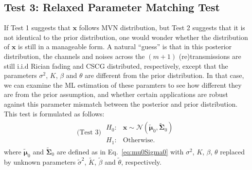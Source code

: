 \documentclass[journal,draftcls,onecolumn,12pt,twoside]{IEEEtran}
\begin{document}
\subsection{Test 3: Relaxed Parameter Matching Test}
If Test 1 suggests that $\mathbf{x}$ follows MVN
distribution, but Test 2 suggests that it is not identical to
the prior distribution, one would wonder whether the distribution of
$\mathbf{x}$ is still in a manageable form. A natural ``guess'' is that in this
posterior distribution, the channels and noises across the $(m+1)$
(re)transmissions are still i.i.d Rician fading and CSCG distributed,
respectively, except that the parameters $\sigma^2$, $K$, $\beta$ and $\theta$
are different from the prior distribution. In that case, we can examine the
ML estimation of these paramters to see how different they are
from the prior assumption, and whether certain applications are robust against
this parameter mismatch between the posterior and prior distribution. This test
is formulated as follows:
\begin{align}
  \mbox{(Test 3) } \begin{array}{ll}H_0: & \mathbf{x}\sim
  \mathcal{N}(\tilde{\bm{\mu}}_0, \tilde{\mathbf{\Sigma}}_0)
  \\
  H_1:
  &
  \mbox{Otherwise.}
  \end{array}
\end{align}
where $\tilde{\bm{\mu}}_0$ and $\tilde{\mathbf{\Sigma}}_0$ are defined as in
Eq.~\eqref{eq:mu0Sigma0} with $\sigma^2$, $K$, $\beta$, $\theta$ replaced by
unknown parameters $\tilde{\sigma}^2$, $\tilde{K}$, $\tilde{\beta}$ and
$\tilde{\theta}$, respectively.
\end{document}
